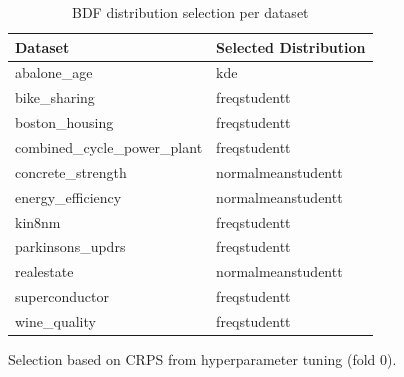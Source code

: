 \begin{table}[htbp]
\centering
\caption{BDF distribution selection per dataset}
\label{tab:bdf-selection}
\begin{tabular}{ll}
\toprule
Dataset & Selected Distribution \\
\midrule
abalone\_age & kde \\
bike\_sharing & freqstudentt \\
boston\_housing & freqstudentt \\
combined\_cycle\_power\_plant & freqstudentt \\
concrete\_strength & normalmeanstudentt \\
energy\_efficiency & normalmeanstudentt \\
kin8nm & freqstudentt \\
parkinsons\_updrs & freqstudentt \\
realestate & normalmeanstudentt \\
superconductor & freqstudentt \\
wine\_quality & freqstudentt \\
\bottomrule
\end{tabular}
\par\smallskip\footnotesize{Selection based on CRPS from hyperparameter tuning (fold 0).}
\end{table}
